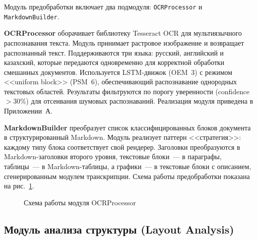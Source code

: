 \documentclass[a4paper,12pt]{article}
\begin{document}
Модуль предобработки включает два подмодуля: \texttt{OCRProcessor} и \texttt{MarkdownBuilder}.

\textbf{OCRProcessor} оборачивает библиотеку Tesseract OCR для мультиязычного распознавания текста. Модуль принимает растровое изображение и возвращает распознанный текст. Поддерживаются три языка: русский, английский и казахский, которые передаются одновременно для корректной обработки смешанных документов. Используется LSTM-движок (OEM~3) с режимом <<uniform block>> (PSM~6), обеспечивающий распознавание однородных текстовых областей. Результаты фильтруются по порогу уверенности (confidence $> 30\%$) для отсеивания шумовых распознаваний. Реализация модуля приведена в Приложении~А.

\textbf{MarkdownBuilder} преобразует список классифицированных блоков документа в структурированный Markdown. Модуль реализует паттерн <<стратегия>>: каждому типу блока соответствует свой рендерер. Заголовки преобразуются в Markdown-заголовки второго уровня, текстовые блоки~--- в параграфы, таблицы~--- в Markdown-таблицы, а графики~--- в текстовые блоки с описанием, сгенерированным модулем транскрипции. Схема работы предобработки показана на рис.~\ref{fig:preprocessing-flow}.

\begin{figure}[H]
\centering
{}
\caption{Схема работы модуля OCRProcessor}
\label{fig:preprocessing-flow}
\end{figure}

\subsection{Модуль анализа структуры (Layout Analysis)}
\end{document}
